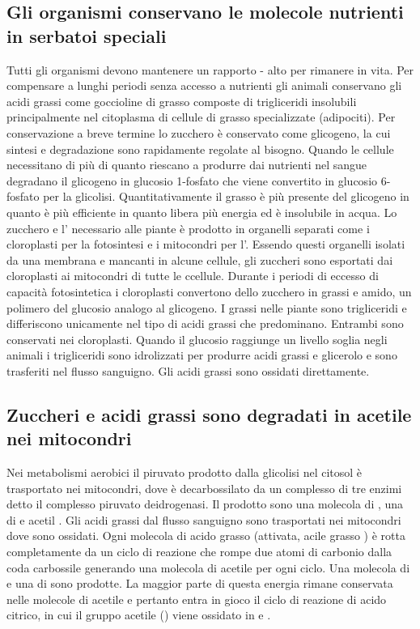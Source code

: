 \subsection{Gli organismi conservano le molecole nutrienti in serbatoi speciali}
Tutti gli organismi devono mantenere un rapporto - alto per rimanere in vita. Per compensare a lunghi periodi senza accesso a nutrienti gli animali conservano gli acidi
grassi come goccioline di grasso composte di trigliceridi insolubili principalmente nel citoplasma di cellule di grasso specializzate (adipociti). Per conservazione a breve termine lo 
zucchero \`e conservato come glicogeno, la cui sintesi e degradazione sono rapidamente regolate al bisogno. Quando le cellule necessitano di pi\`u  di quanto riescano a produrre
dai nutrienti nel sangue degradano il glicogeno in glucosio 1-fosfato che viene convertito in glucosio 6-fosfato per la glicolisi. Quantitativamente il grasso \`e pi\`u presente del
glicogeno in quanto \`e pi\`u efficiente in quanto libera pi\`u energia ed \`e insolubile in acqua. Lo zucchero e l' necessario alle piante \`e prodotto in organelli separati
come i cloroplasti per la fotosintesi e i mitocondri per l'. Essendo questi organelli isolati da una membrana e mancanti in alcune cellule, gli zuccheri sono esportati dai 
cloroplasti ai mitocondri di tutte le ccellule. Durante i periodi di eccesso di capacit\`a fotosintetica i cloroplasti convertono dello zucchero in grassi e amido, un polimero del
glucosio analogo al glicogeno. I grassi nelle piante sono trigliceridi e differiscono unicamente nel tipo di acidi grassi che predominano. Entrambi sono conservati nei cloroplasti. 
Quando il glucosio raggiunge un livello soglia negli animali i trigliceridi sono idrolizzati per produrre acidi grassi e glicerolo e sono trasferiti nel flusso sanguigno. Gli acidi 
grassi sono ossidati direttamente.
\subsection{Zuccheri e acidi grassi sono degradati in acetile  nei mitocondri}
Nei metabolismi aerobici il piruvato prodotto dalla glicolisi nel citosol \`e trasportato nei mitocondri, dove \`e decarbossilato da un complesso di tre enzimi detto il complesso 
piruvato deidrogenasi. Il prodotto sono una molecola di , una di  e acetil . Gli acidi grassi dal flusso sanguigno sono trasportati nei mitocondri dove sono
ossidati. Ogni molecola di acido grasso (attivata, acile grasso ) \`e rotta completamente da un ciclo di reazione che rompe due atomi di carbonio dalla coda carbossile generando
una molecola di acetile  per ogni ciclo. Una molecola di  e una di  sono prodotte. La maggior parte di questa energia rimane conservata nelle molecole di 
acetile  e pertanto entra in gioco il ciclo di reazione di acido citrico, in cui il gruppo acetile () viene ossidato in  e . 
